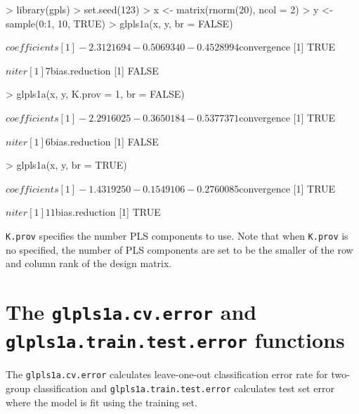 \documentclass[11pt]{article}
\newcommand{\Rfunction}[1]{{\texttt{#1}}}
\begin{document}
\begin{Schunk}
\begin{Sinput}
> library(gpls)
> set.seed(123)
> x <- matrix(rnorm(20), ncol = 2)
> y <- sample(0:1, 10, TRUE)
> glpls1a(x, y, br = FALSE)
\end{Sinput}
\begin{Soutput}
$coefficients
[1] -2.3121694 -0.5069340 -0.4528994

$convergence
[1] TRUE

$niter
[1] 7

$bias.reduction
[1] FALSE
\end{Soutput}
\begin{Sinput}
> glpls1a(x, y, K.prov = 1, br = FALSE)
\end{Sinput}
\begin{Soutput}
$coefficients
[1] -2.2916025 -0.3650184 -0.5377371

$convergence
[1] TRUE

$niter
[1] 6

$bias.reduction
[1] FALSE
\end{Soutput}
\begin{Sinput}
> glpls1a(x, y, br = TRUE)
\end{Sinput}
\begin{Soutput}
$coefficients
[1] -1.4319250 -0.1549106 -0.2760085

$convergence
[1] TRUE

$niter
[1] 11

$bias.reduction
[1] TRUE
\end{Soutput}
\end{Schunk}
{\tt K.prov} specifies the number PLS components to use. Note that
when {\tt K.prov} is no specified, the number of PLS components are
set to be the smaller of the row and column rank of the design
matrix.\\

\section*{The \Rfunction{glpls1a.cv.error} and
          \Rfunction{glpls1a.train.test.error} functions}
The \Rfunction{glpls1a.cv.error} calculates leave-one-out classification
error rate for two-group classification and
\texttt{glpls1a.train.test.error}
calculates test set error where the model is fit using the training
set.\\
\end{document}
